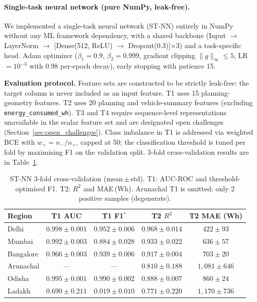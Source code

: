 \documentclass{article}
\begin{document}
\paragraph{Single-task neural network (pure NumPy, leak-free).}
We implemented a single-task neural network (ST-NN) entirely in NumPy
without any ML framework dependency, with a shared backbone
(Input $\to$ LayerNorm $\to$ [Dense(512, ReLU) $\to$ Dropout(0.3)]$\times$3)
and a task-specific head. Adam optimizer ($\beta_1=0.9$, $\beta_2=0.999$,
gradient clipping $\|g\|_\infty \leq 5$, LR $= 10^{-3}$ with 0.98
per-epoch decay), early stopping with patience 15.

\textbf{Evaluation protocol.}
Feature sets are constructed to be strictly leak-free: the target
column is never included as an input feature.
T1 uses 15 planning-geometry features.
T2 uses 20 planning and vehicle-summary features (excluding
\texttt{energy\_consumed\_wh}).
T3 and T4 require sequence-level representations unavailable in the scalar
feature set and are designated open challenges (Section~\ref{sec:open_challenges}).
Class imbalance in T1 is addressed via weighted BCE with
$w_+ = n_-/n_+$, capped at 50; the classification threshold is tuned
per fold by maximising F1 on the validation split.
3-fold cross-validation results are in Table~\ref{tab:nn_results}.

\begin{table}[h]
\centering
\caption{ST-NN 3-fold cross-validation (mean\,$\pm$\,std). T1: AUC-ROC and
threshold-optimised F1. T2: $R^2$ and MAE\,(Wh).
Arunachal T1 is omitted: only 2 positive samples (degenerate).}
\label{tab:nn_results}
\small
\begin{tabular}{lcccc}
\toprule
Region & T1 AUC & T1 F1$^*$ & T2 $R^2$ & T2 MAE (Wh) \\
\midrule
Delhi      & $\mathbf{0.998 \pm 0.001}$ & $0.952 \pm 0.006$ & $\mathbf{0.968 \pm 0.014}$ & $422 \pm 93$ \\
Mumbai     & $\mathbf{0.992 \pm 0.003}$ & $0.884 \pm 0.028$ & $\mathbf{0.933 \pm 0.022}$ & $636 \pm 57$ \\
Bangalore  & $\mathbf{0.966 \pm 0.003}$ & $0.939 \pm 0.006$ & $\mathbf{0.917 \pm 0.004}$ & $703 \pm 20$ \\
Arunachal  & --- & --- & $0.810 \pm 0.188$ & $1{,}081 \pm 646$ \\
Odisha     & $\mathbf{0.995 \pm 0.001}$ & $0.990 \pm 0.002$ & $\mathbf{0.888 \pm 0.007}$ & $860 \pm 24$ \\
Ladakh     & $0.690 \pm 0.211$ & $0.019 \pm 0.010$ & $0.771 \pm 0.220$ & $1{,}170 \pm 736$ \\
\bottomrule
\end{tabular}
\end{table}
\end{document}
